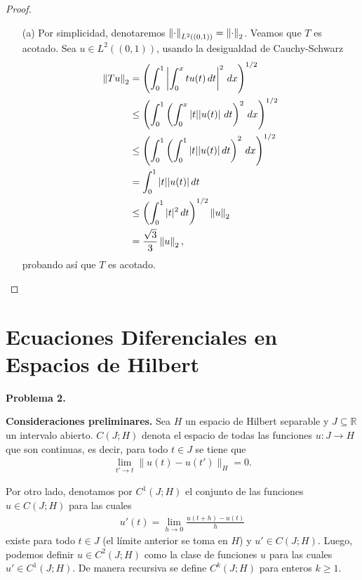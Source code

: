 \begin{proof}
    \begin{enumerate}
        \item[(a)] Por simplicidad, denotaremos $\left\|\cdot\right\|_{L^2((0,1))}=\left\|\cdot\right\|_2$. Veamos que $T$ es acotado. Sea $u \in L^2((0,1))$, usando la desigualdad de Cauchy-Schwarz
        \begin{align*}
            \norm{Tu}_2&=\left(\int_0^1\left|\int_0^x tu(t)\, dt\right|^2\, dx\right)^{1/2}\\
            &\leq \left(\int_0^1 \left(\int_0^x |t||u(t)|\ dt\right)^2\, dx\right)^{1/2}\\
            &\leq \left(\int_0^1 \left(\int_0^1|t||u(t)|\, dt\right)^2\, dx\right)^{1/2}\\
            &=\int_0^1 |t||u(t)|\, dt\\
            &\leq \left(\int_0^1 |t|^2\, dt\right)^{1/2}\norm{u}_2\\
            &=\dfrac{\sqrt{3}}{3}\norm{u}_2,
        \end{align*}
        probando así que $T$ es acotado.
    \end{enumerate}
\end{proof}

\section{Ecuaciones Diferenciales en Espacios de Hilbert}

\textbf{Problema 2.}

\textbf{Consideraciones preliminares.} Sea $H$ un espacio de Hilbert separable y $J \subseteq \mathbb{R}$ un intervalo abierto. $C(J;H)$ denota el espacio de todas las funciones $u : J \to H$ que son continuas, es decir, para todo $t \in J$ se tiene que
\begin{align*}
  \lim_{t' \to t} \|u(t) - u(t')\|_H = 0.
\end{align*}

Por otro lado, denotamos por $C^1(J;H)$ el conjunto de las funciones $u \in C(J;H)$ para las cuales
\begin{align*}
  u'(t) = \lim_{h \to 0} \frac{u(t+h) - u(t)}{h}
\end{align*}
existe para todo $t \in J$ (el límite anterior se toma en $H$) y $u' \in C(J;H)$. Luego, podemos definir $u \in C^2(J;H)$ como la clase de funciones $u$ para las cuales $u' \in C^1(J;H)$. De manera recursiva se define $C^k(J;H)$ para enteros $k \geq 1$.

